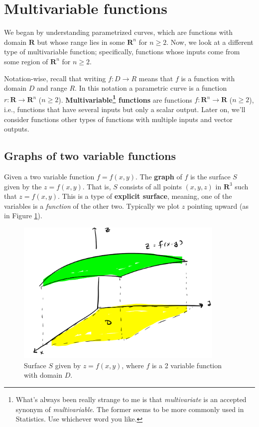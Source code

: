 \documentclass[12pt]{article}
\numberwithin{equation}{subsection}
\numberwithin{figure}{subsection}
\theoremstyle{note}
\begin{document}
{\section{Multivariable functions}\label{multivar-function}

We began by understanding parametrized curves, which are functions with domain $\mathbf{R}$ but whose range lies in some $\mathbf{R}^n$ for $n\geq 2$. Now, we look at a different type of multivariable function; specifically, functions whose inputs come from some region of $\mathbf{R}^n$ for $n\geq 2$. 

Notation-wise, recall that writing $f\colon D\to R$ means that $f$ is a function with domain $D$ and range $R$. In this notation a parametric curve is a function $r\colon \mathbf{R}\to \mathbf{R}^n$ ($n\geq 2$). \textbf{Multivariable\footnote{What's always been really strange to me is that \textit{multivariate} is an accepted synonym of \textit{multivariable}. The former seems to be more commonly used in Statistics. Use whichever word you like.} functions} are functions $f\colon \mathbf{R}^n \to \mathbf{R}$ ($n\geq 2$), i.e., functions that have several inputs but only a scalar output. Later on, we'll consider functions other types of functions with multiple inputs and vector outputs.


\subsection{Graphs of two variable functions}
Given a two variable function $f=f(x,y)$. The \textbf{graph} of $f$ is the surface $S$ given by the $z=f(x,y)$. That is, $S$ consists of all points $(x,y,z)$ in $\mathbf{R}^3$ such that $z=f(x,y)$. This is a type of \textbf{explicit surface}, meaning, one of the variables is a \textit{function} of the other two.  Typically we plot $z$ pointing upward (as in Figure \ref{fig-exp-surface}). 

\begin{figure}[h!]
\centering
\includegraphics[width=100mm]{Images/surface-explicit}
\caption{Surface $S$ given by $z=f(x,y)$, where $f$ is a 2 variable function with domain $D$.}
\label{fig-exp-surface}
\end{figure}

}
\end{document}
